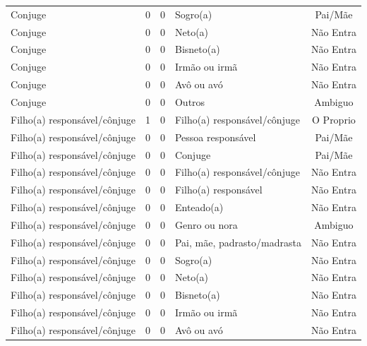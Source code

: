 \documentclass[
	12pt,				%
	openright,			%
	twoside,			%
	a4paper,			%
	english,			%
	french,				%
	spanish,			%
	brazil				%
	]{abntex2}
\begin{document}
\begin{anexosenv}
\begin{longtable}{@{}lcclc@{}}
Conjuge                      & 0         & 0        & Sogro(a)                     & Pai/Mãe         \\
Conjuge                      & 0         & 0        & Neto(a)                      & Não Entra       \\
Conjuge                      & 0         & 0        & Bisneto(a)                   & Não Entra       \\
Conjuge                      & 0         & 0        & Irmão ou irmã                & Não Entra       \\
Conjuge                      & 0         & 0        & Avô ou avó                   & Não Entra       \\
Conjuge                      & 0         & 0        & Outros                       & Ambiguo         \\
Filho(a) responsável/cônjuge & 1         & 0        & Filho(a) responsável/cônjuge & O Proprio       \\
Filho(a) responsável/cônjuge & 0         & 0        & Pessoa responsável           & Pai/Mãe         \\
Filho(a) responsável/cônjuge & 0         & 0        & Conjuge                      & Pai/Mãe         \\
Filho(a) responsável/cônjuge & 0         & 0        & Filho(a) responsável/cônjuge & Não Entra       \\
Filho(a) responsável/cônjuge & 0         & 0        & Filho(a) responsável         & Não Entra       \\
Filho(a) responsável/cônjuge & 0         & 0        & Enteado(a)                   & Não Entra       \\
Filho(a) responsável/cônjuge & 0         & 0        & Genro ou nora                & Ambiguo         \\
Filho(a) responsável/cônjuge & 0         & 0        & Pai, mãe, padrasto/madrasta  & Não Entra       \\
Filho(a) responsável/cônjuge & 0         & 0        & Sogro(a)                     & Não Entra       \\
Filho(a) responsável/cônjuge & 0         & 0        & Neto(a)                      & Não Entra       \\
Filho(a) responsável/cônjuge & 0         & 0        & Bisneto(a)                   & Não Entra       \\
Filho(a) responsável/cônjuge & 0         & 0        & Irmão ou irmã                & Não Entra       \\
Filho(a) responsável/cônjuge & 0         & 0        & Avô ou avó                   & Não Entra       \\

\end{longtable}
\end{anexosenv}
\end{document}
